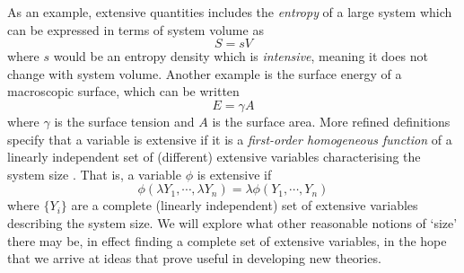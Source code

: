 As an example, extensive quantities includes the \emph{entropy} of a large system which can be expressed in terms of system volume as
\begin{equation*}
  S = s V
\end{equation*}
where $s$ would be an entropy density which is \emph{intensive}, meaning it does not change with system volume.
Another example is the surface energy of a macroscopic surface, which can be written
\begin{equation*}
  E = \gamma A
\end{equation*}
where $\gamma$ is the surface tension and $A$ is the surface area.
More refined definitions specify that a variable is extensive if it is a \emph{first-order homogeneous function} of a linearly independent set of (different) extensive variables characterising the system size \cite{Chandler1987}.
That is, a variable $\phi$ is extensive if
\begin{equation}\label{eq:extensive-homogeneity}
  \phi(\lambda Y_1, \cdots, \lambda Y_n)
  =
  \lambda \phi(Y_1, \cdots, Y_n)
\end{equation}
where $\{Y_i\}$ are a complete (linearly independent) set of extensive variables describing the system size.
We will explore what other reasonable notions of `size' there may be, in effect finding a complete set of extensive variables, in the hope that we arrive at ideas that prove useful in developing new theories.

